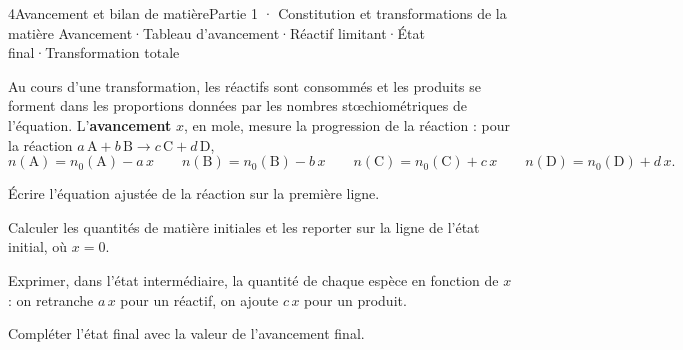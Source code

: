 \begin{ouverture}[avancement]{4}{Avancement et bilan de matière}{Partie 1 · Constitution et transformations de la matière}
{Avancement\enspace·\enspace Tableau d'avancement\enspace·\enspace Réactif limitant\enspace·\enspace État final\enspace·\enspace Transformation totale}
\end{ouverture}
\essentiel
{}
\begin{definition}
Au cours d'une transformation, les réactifs sont consommés et les produits se forment dans les proportions données par les
nombres stœchiométriques de l'équation. L'\textbf{avancement} $x$, en mole, mesure la progression de la réaction : pour la
réaction $a\,\mathrm{A}+b\,\mathrm{B}\longrightarrow c\,\mathrm{C}+d\,\mathrm{D}$,
\[n(\mathrm{A})=n_0(\mathrm{A})-a\,x\qquad n(\mathrm{B})=n_0(\mathrm{B})-b\,x\qquad n(\mathrm{C})=n_0(\mathrm{C})+c\,x\qquad n(\mathrm{D})=n_0(\mathrm{D})+d\,x.\]
\end{definition}
\begin{savoirfaire}
\begin{questions}
\item Écrire l'équation ajustée de la réaction sur la première ligne.
\item Calculer les quantités de matière initiales et les reporter sur la ligne de l'état initial, où $x=0$.
\item Exprimer, dans l'état intermédiaire, la quantité de chaque espèce en fonction de $x$ : on retranche $a\,x$ pour un
réactif, on ajoute $c\,x$ pour un produit.
\item Compléter l'état final avec la valeur de l'avancement final.
\end{questions}
\end{savoirfaire}
